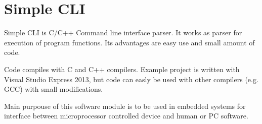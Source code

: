 \hypertarget{index_SIMPLE_CLI}{}\section{Simple C\+L\+I}\label{index_SIMPLE_CLI}
Simple C\+L\+I is C/\+C++ Command line interface parser. It works as parser for execution of program functions. Its advantages are easy use and small amount of code.

Code compiles with C and C++ compilers. Example project is written with Visual Studio Express 2013, but code can easly be used with other compilers (e.\+g. G\+C\+C) with small modifications.

Main purpouse of this software module is to be used in embedded systems for interface between microprocessor controlled device and human or P\+C software. 